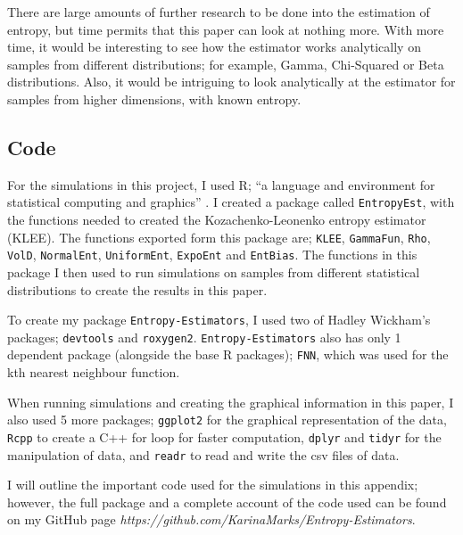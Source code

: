 \documentclass[12pt]{report}
\begin{document}
There are large amounts of further research to be done into the estimation of entropy, but time permits that this paper can look at nothing more. With more time, it would be interesting to see how the estimator works analytically on samples from different distributions; for example, Gamma, Chi-Squared or Beta distributions. Also, it would be intriguing to look analytically at the estimator for samples from higher dimensions, with known entropy.






\begin{appendix}


\lstset{showstringspaces=false, breaklines=true}

\chapter{Code} \label{appendix_code}

For the simulations in this project, I used R; ``a language and environment for statistical computing and graphics'' \cite{code1}. I created a package called \texttt{EntropyEst}, with the functions needed to created the Kozachenko-Leonenko entropy estimator (KLEE). The functions exported form this package are; \texttt{KLEE}, \texttt{GammaFun}, \texttt{Rho}, \texttt{VolD}, \texttt{NormalEnt}, \texttt{UniformEnt}, \texttt{ExpoEnt} and \texttt{EntBias}. The functions in this package I then used to run simulations on samples from different statistical distributions to create the results in this paper.

To create my package \texttt{Entropy-Estimators}, I used two of Hadley Wickham's \cite{code2} packages; \texttt{devtools} and \texttt{roxygen2}. \texttt{Entropy-Estimators} also has only 1 dependent package (alongside the base R packages); \texttt{FNN}, which was used for the kth nearest neighbour function. 

When running simulations and creating the graphical information in this paper, I also used 5 more packages;  \texttt{ggplot2} for the graphical representation of the data, \texttt{Rcpp} to create a C++ for loop for faster computation, \texttt{dplyr} and \texttt{tidyr} for the manipulation of data, and \texttt{readr} to read and write the csv files of data.

I will outline the important code used for the simulations in this appendix; however, the full package and a complete account of the code used can be found on my GitHub page \textit{https://github.com/KarinaMarks/Entropy-Estimators}.


\end{appendix}
\end{document}
